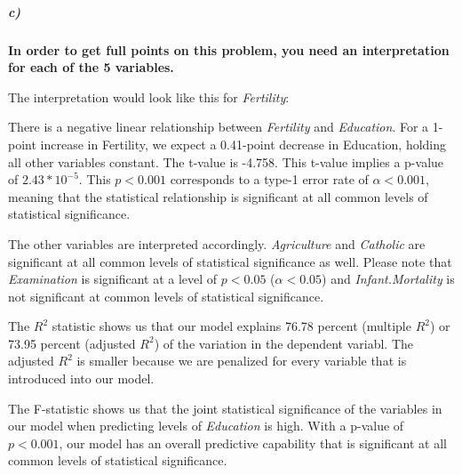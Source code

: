 \documentclass[12pt]{article}\usepackage[]{graphicx}\usepackage[]{color}
\begin{document}
\subparagraph{c)} \textbf{In order to get full points on this problem, you need an interpretation for each of the 5 variables.}

The interpretation would look like this for \textit{Fertility}:

There is a negative linear relationship between \textit{Fertility} and \textit{Education}. For a 1-point increase in Fertility, we expect a 0.41-point decrease in Education, holding all other variables constant. The t-value is -4.758. This t-value implies a p-value of $2.43*10^{-5}$. This $p < 0.001$ corresponds to a type-1 error rate of $\alpha < 0.001$, meaning that the statistical relationship is significant at all common levels of statistical significance.

The other variables are interpreted accordingly. \textit{Agriculture} and \textit{Catholic} are significant at all common levels of statistical significance as well. Please note that \textit{Examination} is significant at a level of $p < 0.05$ ($\alpha < 0.05$) and \textit{Infant.Mortality} is not significant at common levels of statistical significance.

The $R^2$ statistic shows us that our model explains 76.78 percent (multiple $R^2$) or 73.95 percent (adjusted $R^2$) of the variation in the dependent variabl. The adjusted $R^2$ is smaller because we are penalized for every variable that is introduced into our model.

The F-statistic shows us that the joint statistical significance of the variables in our model when predicting levels of \textit{Education} is high. With a p-value of $p < 0.001$, our model has an overall predictive capability that is significant at all common levels of statistical significance.
\end{document}
